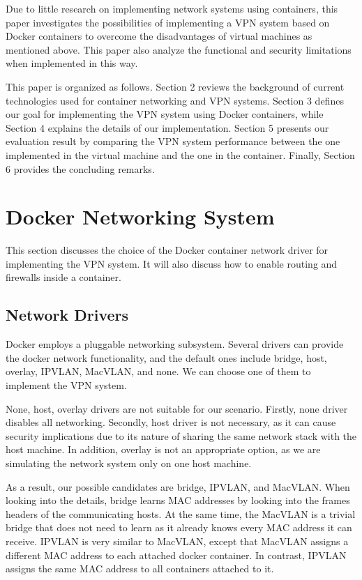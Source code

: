 \documentclass[article]{aaltoseries}
\begin{document}
Due to little research on implementing network systems using containers, this paper investigates the possibilities of implementing a VPN system based on Docker containers to overcome the disadvantages of virtual machines as mentioned above. This paper also analyze the functional and security limitations when implemented in this way.

This paper is organized as follows. Section 2 reviews the background of current technologies used for container networking and VPN systems. Section 3 defines our goal for implementing the VPN system using Docker containers, while Section 4 explains the details of our implementation. Section 5 presents our evaluation result by comparing the VPN system performance between the one implemented in the virtual machine and the one in the container. Finally, Section 6 provides the concluding remarks.



\section{Docker Networking System}
This section discusses the choice of the Docker container network driver for implementing the VPN system. It will also discuss how to enable routing and firewalls inside a container.

\subsection{Network Drivers}
Docker employs a pluggable networking subsystem. Several drivers can provide the docker network functionality, and the default ones include bridge, host, overlay, IPVLAN, MacVLAN, and none. We can choose one of them to implement the VPN system.

None, host, overlay drivers are not suitable for our scenario. Firstly, none driver disables all networking. Secondly, host driver is not necessary, as it can cause security implications due to its nature of sharing the same network stack with the host machine. In addition, overlay is not an appropriate option, as we are simulating the network system only on one host machine.

As a result, our possible candidates are bridge, IPVLAN, and MacVLAN. When looking into the details, bridge learns MAC addresses by looking into the frames headers of the communicating hosts. At the same time, the MacVLAN is a trivial bridge that does not need to learn as it already knows every MAC address it can receive. IPVLAN is very similar to MacVLAN, except that MacVLAN assigns a different MAC address to each attached docker container. In contrast, IPVLAN assigns the same MAC address to all containers attached to it.
\end{document}

